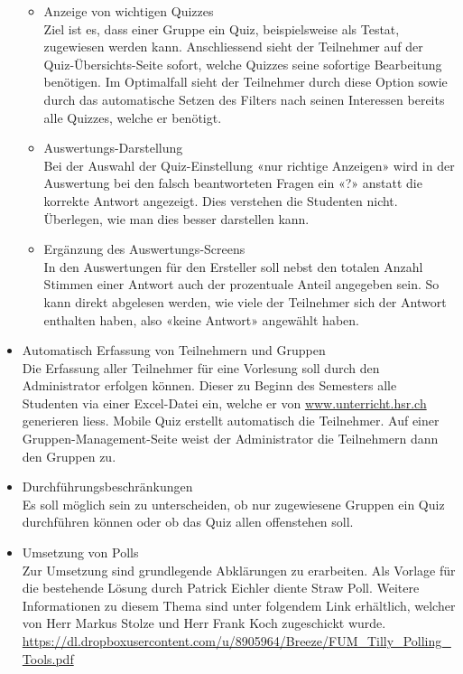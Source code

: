 \begin{itemize}
\begin{itemize}
		\item Anzeige von wichtigen Quizzes \\
		Ziel ist es, dass einer Gruppe ein Quiz, beispielsweise als Testat, zugewiesen werden kann. Anschliessend sieht der Teilnehmer auf der Quiz-Übersichts-Seite sofort, welche Quizzes seine sofortige Bearbeitung benötigen.
		Im Optimalfall sieht der Teilnehmer durch diese Option sowie durch das automatische Setzen des Filters nach seinen Interessen bereits alle Quizzes, welche er benötigt.
		
		\item Auswertungs-Darstellung \\
		Bei der Auswahl der Quiz-Einstellung «nur richtige Anzeigen» wird in der Auswertung bei den falsch beantworteten Fragen ein «?» anstatt die korrekte Antwort angezeigt. Dies verstehen die Studenten nicht. Überlegen, wie man dies besser darstellen kann.
		
		\item Ergänzung des Auswertungs-Screens\\
		In den Auswertungen für den Ersteller soll nebst den totalen Anzahl Stimmen einer Antwort auch der prozentuale Anteil angegeben sein. So kann direkt abgelesen werden, wie viele der Teilnehmer sich der Antwort enthalten haben, also «keine Antwort» angewählt haben.
	\end{itemize}
	
	\item Automatisch Erfassung von Teilnehmern und Gruppen \\
	Die Erfassung aller Teilnehmer für eine Vorlesung soll durch den Administrator erfolgen können. Dieser zu Beginn des Semesters alle Studenten via einer Excel-Datei ein, welche er von \url{www.unterricht.hsr.ch} generieren liess. Mobile Quiz erstellt automatisch die Teilnehmer. Auf einer Gruppen-Management-Seite weist der Administrator die Teilnehmern dann den Gruppen zu.
	
	\item Durchführungsbeschränkungen \\
	Es soll möglich sein zu unterscheiden, ob nur zugewiesene Gruppen ein Quiz durchführen können oder ob das Quiz allen offenstehen soll.
	
	\item Umsetzung von Polls \\
	Zur Umsetzung sind  grundlegende Abklärungen zu erarbeiten.
	Als Vorlage für die bestehende Lösung durch Patrick Eichler diente \glqq Straw Poll\grqq . \cite{straw_poll} Weitere Informationen zu diesem Thema sind unter folgendem Link erhältlich, welcher von Herr Markus Stolze und Herr Frank Koch zugeschickt wurde. \url{https://dl.dropboxusercontent.com/u/8905964/Breeze/FUM_Tilly_Polling_Tools.pdf}
	

\end{itemize}
